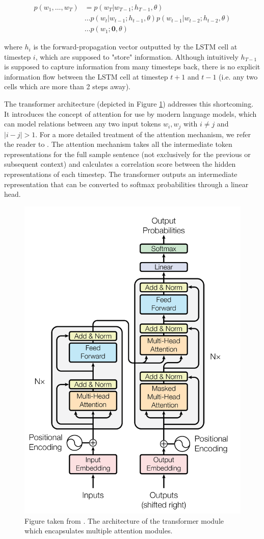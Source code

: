 \documentclass[a4paper,12pt,oneside,openright]{report}
\begin{document}
\begin{align}
p(w_1, \ldots, w_T) &= p(w_T | w_{T-1}; h_{T-1}, \theta) \nonumber  \\
& \ldots p(w_t | w_{t-1}; h_{t-1}, \theta) p(w_{t-1} | w_{t-2}; h_{t-2}, \theta) \nonumber \\
& \ldots p(w_1 ; \mathbf{0}, \theta) 
\end{align}

where $h_{i}$ is the forward-propagation vector outputted by the LSTM cell at timestep $i$, which are supposed to "store" information.
Although intuitively $h_{T-1}$ is supposed to capture information from many timesteps back, there is no explicit information flow between the LSTM cell at timestep $t+1$ and $t-1$ (i.e. any two cells which are more than 2 steps away).

The transformer architecture \cite{vaswani17} (depicted in Figure \ref{fig:attention_is_all_you_need}) addresses this shortcoming.
It introduces the concept of attention for use by modern language models, which can model relations between any two input tokens $w_i, w_j$ with $i \neq j$ and $| i - j |  > 1$.
For a more detailed treatment of the attention mechanism, we refer the reader to \cite{bahdanau16}.
The attention mechanism takes all the intermediate token representations for the full sample sentence (not exclusively for the previous or subsequent context) and calculates a correlation score between the hidden representations of each timestep.
The transformer outputs an intermediate representation that can be converted to softmax probabilities through a linear head.

\begin{figure}[H]
	\center
  \includegraphics[width=0.43\linewidth]{./assets/background/transformer_module.png}
  \caption{Figure taken from \cite{vaswani17}. The architecture of the transformer module which encapsulates multiple attention modules.}
  \label{fig:attention_is_all_you_need}
\end{figure}
\end{document}
